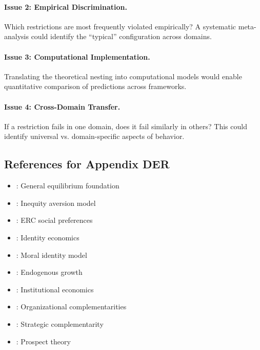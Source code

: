 \paragraph{Issue 2: Empirical Discrimination.}
Which restrictions are most frequently violated empirically? A systematic
meta-analysis could identify the ``typical'' configuration across domains.

\paragraph{Issue 3: Computational Implementation.}
Translating the theoretical nesting into computational models would enable
quantitative comparison of predictions across frameworks.

\paragraph{Issue 4: Cross-Domain Transfer.}
If a restriction fails in one domain, does it fail similarly in others?
This could identify universal vs. domain-specific aspects of behavior.


\subsection{References for Appendix DER}
\label{sec:A-references}

\begin{itemize}[nosep]
    \item \citet{arrowdeb}: General equilibrium foundation
    \item \citet{fehrschmidt}: Inequity aversion model
    \item \citet{boltonockenfels}: ERC social preferences
    \item \citet{akerlofkranton}: Identity economics
    \item \citet{benaboutirole}: Moral identity model
    \item \citet{aghionhowitt}: Endogenous growth
    \item \citet{acemoglu}: Institutional economics
    \item \citet{roberts2004}: Organizational complementarities
    \item \citet{milgromroberts1990}: Strategic complementarity
    \item \citet{kahnemantversky1979}: Prospect theory
\end{itemize}

